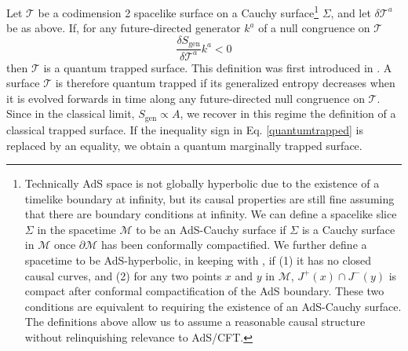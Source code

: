 \documentclass[12pt]{article}
\theoremstyle{remark}
\numberwithin{equation}{section}
\numberwithin{equation}{section}
\begin{document}
Let $\mathcal{T}$ be a codimension 2 spacelike surface on a Cauchy surface\footnote{Technically AdS space is not globally hyperbolic due to the existence of a timelike boundary at infinity, but its causal properties are still fine assuming that there are boundary conditions at infinity.  We can define a spacelike slice $\Sigma$ in the spacetime $\mathcal{M}$ to be an AdS-Cauchy surface if $\Sigma$ is a Cauchy surface in $\mathcal{M}$ once $\partial \mathcal{M}$ has been conformally compactified. We further define a spacetime to be AdS-hyperbolic, in keeping with \cite{WallMaximin}, if (1) it has no closed causal curves, and (2) for any two points $x$ and $y$ in $\mathcal{M}$, $J^{+}(x)\cap J^{-}(y)$ is compact after conformal compactification of the AdS boundary. These two conditions are equivalent to requiring the existence of an AdS-Cauchy surface. The definitions above allow us to assume a reasonable causal structure without relinquishing relevance to AdS/CFT. } $\Sigma$, and let $\delta \mathcal{T}^{a}$ be as above. If, for any future-directed generator $k^{a}$ of a null congruence on $\mathcal{T}$
\begin{equation} \frac{\delta S_\mathrm{gen}}{\delta \mathcal{T}^{a}}k^{a}<0 \label{quantumtrapped} \end{equation}
then $\mathcal{T}$ is a quantum trapped surface. This definition was first introduced in \cite{Wall12}. A surface $\mathcal{T}$ is therefore quantum trapped if its generalized entropy decreases when it is evolved forwards in time along any future-directed null congruence on $\mathcal{T}$. Since in the classical limit, $S_\mathrm{gen}\propto A$, we recover in this regime the definition of a classical trapped surface. If the inequality sign in Eq. \ref{quantumtrapped} is replaced by an equality, we obtain a quantum marginally trapped surface.
\end{document}
